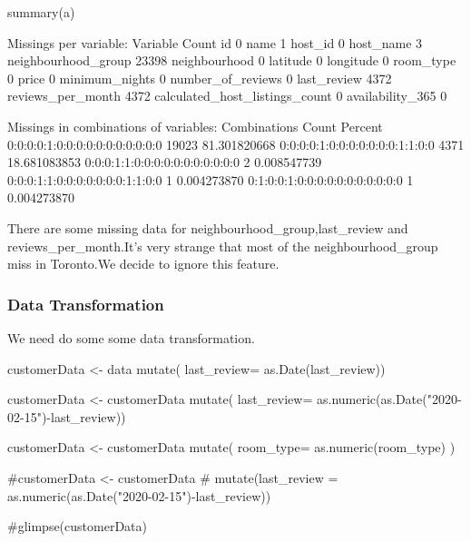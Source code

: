 \begin{Schunk}
\begin{Sinput}
summary(a)
\end{Sinput}
\begin{Soutput}

 Missings per variable: 
                       Variable Count
                             id     0
                           name     1
                        host_id     0
                      host_name     3
            neighbourhood_group 23398
                  neighbourhood     0
                       latitude     0
                      longitude     0
                      room_type     0
                          price     0
                 minimum_nights     0
              number_of_reviews     0
                    last_review  4372
              reviews_per_month  4372
 calculated_host_listings_count     0
               availability_365     0

 Missings in combinations of variables: 
                    Combinations Count      Percent
 0:0:0:0:1:0:0:0:0:0:0:0:0:0:0:0 19023 81.301820668
 0:0:0:0:1:0:0:0:0:0:0:0:1:1:0:0  4371 18.681083853
 0:0:0:1:1:0:0:0:0:0:0:0:0:0:0:0     2  0.008547739
 0:0:0:1:1:0:0:0:0:0:0:0:1:1:0:0     1  0.004273870
 0:1:0:0:1:0:0:0:0:0:0:0:0:0:0:0     1  0.004273870
\end{Soutput}
\end{Schunk}

There are some missing data for neighbourhood\_group,last\_review and
reviews\_per\_month.It's very strange that most of the
neighbourhood\_group miss in Toronto.We decide to ignore this feature.

\hypertarget{data-transformation}{%
\subsubsection{Data Transformation}\label{data-transformation}}

We need do some some data transformation.

\begin{Schunk}
\begin{Sinput}
customerData <- data %>% 
  mutate( last_review= as.Date(last_review)) 
         
customerData <- customerData %>% 
  mutate( last_review= as.numeric(as.Date("2020-02-15")-last_review)) 

customerData <- customerData %>% 
  mutate( room_type= as.numeric(room_type) )

#customerData <- customerData %>% 
#  mutate(last_review = as.numeric(as.Date("2020-02-15")-last_review))

#glimpse(customerData)
\end{Sinput}
\end{Schunk}

